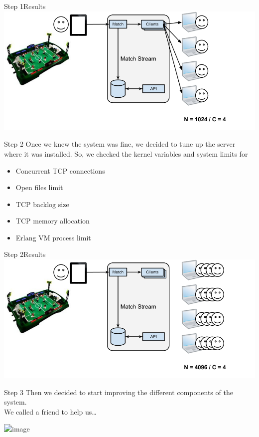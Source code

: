 \documentclass[utf8]{beamer}
\begin{document}
\begin{frame}{Step 1}{Results}
	\includegraphics[top=-1,width=\textwidth]{img/MatchStream-1.png}
\end{frame}

\begin{frame}{Step 2}
Once we knew the system was fine, we decided to tune up the server where it was installed.
\pause
So, we checked the kernel variables and system limits for
\begin{itemize}
	\item<+-> Concurrent TCP connections
	\item<+-> Open files limit
	\item<+-> TCP backlog size
	\item<+-> TCP memory allocation
	\item<+-> Erlang VM process limit
\end{itemize}
\end{frame}

\begin{frame}{Step 2}{Results}
	\includegraphics[top=-1,width=\textwidth]{img/MatchStream-2.png}
\end{frame}

\begin{frame}[t]{Step 3}
Then we decided to start improving the different components of the system.\\
\pause
We called a friend to help us\ldots
	\begin{center}
		\includegraphics<3>[width=.65\textwidth]{img/macgyver.jpg}
	\end{center}
\end{frame}
\end{document}
